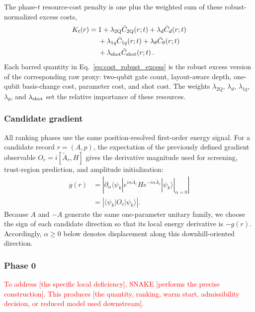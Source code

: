 \documentclass[
  reprint,
  amsmath,
  amssymb,
  aps,
  pra,
  nofootinbib,
  superscriptaddress,
  floatfix
]{revtex4-2}
\newcommand{\twq}{\mathrm{2Q}}
\begin{document}
The phase-\(t\) resource-cost penalty is one plus the weighted sum of these robust-normalized excess costs,
\begin{equation}
\begin{aligned}
K_t(r)
={}&
1+\lambda_{\twq}\bar C_{\twq}(r;t)
+\lambda_d \bar C_d(r;t)\\
&+\lambda_{1q}\bar C_{1q}(r;t)
 +\lambda_\theta \bar C_\theta(r;t)\\
&+\lambda_{\rm shot}\bar C_{\rm shot}(r;t)\,.
\end{aligned}
\label{eq:hardware_cost_sum}
\end{equation}
%
Each barred quantity in Eq.~\eqref{eq:cost_robust_excess} is the robust excess version of the corresponding raw proxy: two-qubit gate count, layout-aware depth, one-qubit basis-change cost, parameter cost, and shot cost. The weights \(\lambda_{\twq}\), \(\lambda_d\), \(\lambda_{1q}\), \(\lambda_\theta\), and \(\lambda_{\rm shot}\) set the relative importance of these resources.

\subsubsection{Candidate gradient}
%
\noindent
All ranking phases use the same position-resolved first-order energy signal.
For a candidate record \(r=(A,p)\), the expectation of the previously defined
gradient observable \(O_r=i[\widetilde A_r,H]\) gives the derivative magnitude
used for screening, trust-region prediction, and amplitude initialization:
\begin{equation}
\begin{aligned}
g(r)
&=
\left|
\left.
\partial_\alpha
\langle\psi_k|
e^{i\alpha\widetilde A_r}
H
e^{-i\alpha\widetilde A_r}
|\psi_k\rangle
\right|_{\alpha=0}
\right|\\
&=\left|\langle\psi_k|O_r|\psi_k\rangle\right| .
\end{aligned}
\label{eq:record_gradient}
\end{equation}
%
Because \(A\) and \(-A\) generate the same one-parameter unitary family, we
choose the sign of each candidate direction so that its local energy derivative
is \(-g(r)\). Accordingly, \(\alpha\ge0\) below denotes displacement along this
downhill-oriented direction.

\subsubsection{Phase 0}
%
\textcolor{red}{To address [the specific local deficiency], SNAKE [performs the precise construction]. This produces [the quantity, ranking, warm start, admissibility decision, or reduced model used downstream].}
\end{document}
